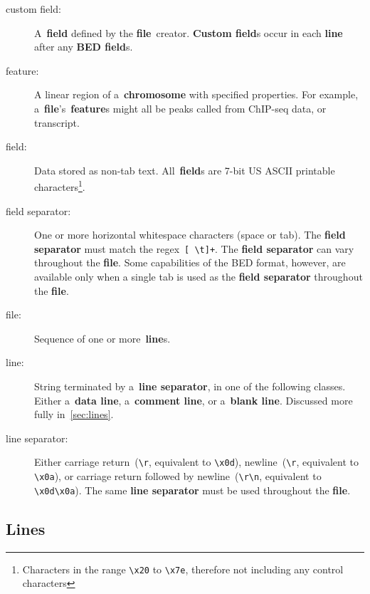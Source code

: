 \documentclass[11pt]{article}
\begin{document}
\begin{description}
\item[custom field:]
  A~\textbf{field} defined by the \textbf{file}~creator.
  \textbf{Custom field}s occur in each \textbf{line} after any \textbf{\acs{BED} field}s.

\item[feature:]
  A linear region of a~\textbf{chromosome} with specified properties.
  For example, a~\textbf{file}'s~\textbf{feature}s might all be peaks called from ChIP-seq data, or transcript.

\item[field:]
  Data stored as non-tab text.
  All~\textbf{field}s are 7-bit US \ac{ASCII} printable characters\footnote{Characters in the range \texttt{{\textbackslash}x20} to \texttt{{\textbackslash}x7e}, therefore not including any control characters}.

\item[field separator:]
  One or more horizontal whitespace characters (space or tab).
  The \textbf{field separator} must match the \ac{regex}~\texttt{[ {\textbackslash}t]+}.
  The \textbf{field separator} can vary throughout the \textbf{file}.
  Some capabilities of the \ac{BED} format, however, are available only when a single tab is used as the \textbf{field separator} throughout the \textbf{file}.

\item[file:]
  Sequence of one or more~\textbf{line}s.

\item[line:]
  String terminated by a~\textbf{line separator}, in one of the following classes.
  Either a~\textbf{data line}, a~\textbf{comment line}, or a~\textbf{blank line}.
  Discussed more fully in~\autoref{sec:lines}.

\item[line separator:]
  Either carriage return~(\texttt{{\textbackslash}r}, equivalent to \texttt{{\textbackslash}x0d}), newline~(\texttt{{\textbackslash}r}, equivalent to \texttt{{\textbackslash}x0a}), or carriage return followed by newline~(\texttt{{\textbackslash}r{\textbackslash}n}, equivalent to \texttt{{\textbackslash}x0d{\textbackslash}x0a}).
  The same \textbf{line separator} must be used throughout the \textbf{file}.
\end{description}

\subsection{Lines}\label{sec:lines}
\end{document}
